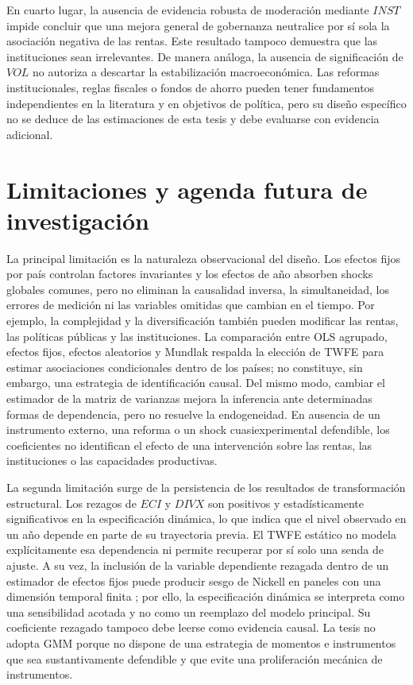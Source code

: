 \documentclass[../../TFM.tex]{subfiles}
\begin{document}
En cuarto lugar, la ausencia de evidencia robusta de moderación mediante $INST$
impide concluir que una mejora general de gobernanza neutralice por sí sola la
asociación negativa de las rentas. Este resultado tampoco demuestra que las
instituciones sean irrelevantes. De manera análoga, la ausencia de significación
de $VOL$ no autoriza a descartar la estabilización macroeconómica. Las reformas
institucionales, reglas fiscales o fondos de ahorro pueden tener fundamentos
independientes en la literatura y en objetivos de política, pero su diseño
específico no se deduce de las estimaciones de esta tesis y debe evaluarse con
evidencia adicional.


\section{Limitaciones y agenda futura de investigación}
\label{sec:limitaciones-agenda}

La principal limitación es la naturaleza observacional del diseño. Los efectos
fijos por país controlan factores invariantes y los efectos de año absorben
shocks globales comunes, pero no eliminan la causalidad inversa, la simultaneidad,
los errores de medición ni las variables omitidas que cambian en el tiempo. Por
ejemplo, la complejidad y la diversificación también pueden modificar las rentas,
las políticas públicas y las instituciones. La comparación entre
OLS agrupado, efectos fijos, efectos aleatorios y Mundlak respalda la
elección de TWFE para estimar asociaciones condicionales dentro de los países;
no constituye, sin embargo, una estrategia de identificación causal. Del mismo
modo, cambiar el estimador de la matriz de varianzas mejora la inferencia ante
determinadas formas de dependencia, pero no resuelve la endogeneidad. En ausencia
de un instrumento externo, una reforma o un shock cuasiexperimental defendible,
los coeficientes no identifican el efecto de una intervención sobre las rentas,
las instituciones o las capacidades productivas.

La segunda limitación surge de la persistencia de los resultados de
transformación estructural. Los rezagos de $ECI$ y $DIVX$ son positivos y
estadísticamente significativos en la especificación dinámica, lo que indica que
el nivel observado en un año depende en parte de su trayectoria previa. El TWFE
estático no modela explícitamente esa dependencia ni permite recuperar por sí
solo una senda de ajuste. A su vez, la inclusión de la variable dependiente
rezagada dentro de un estimador de efectos fijos puede producir sesgo de Nickell
en paneles con una dimensión temporal finita \parencite{Nickell1981}; por ello,
la especificación dinámica se interpreta como una sensibilidad acotada y no
como un reemplazo del modelo principal. Su coeficiente rezagado tampoco debe
leerse como evidencia causal. La tesis no adopta GMM porque no dispone de una
estrategia de momentos e instrumentos que sea sustantivamente defendible y que
evite una proliferación mecánica de instrumentos.
\end{document}
